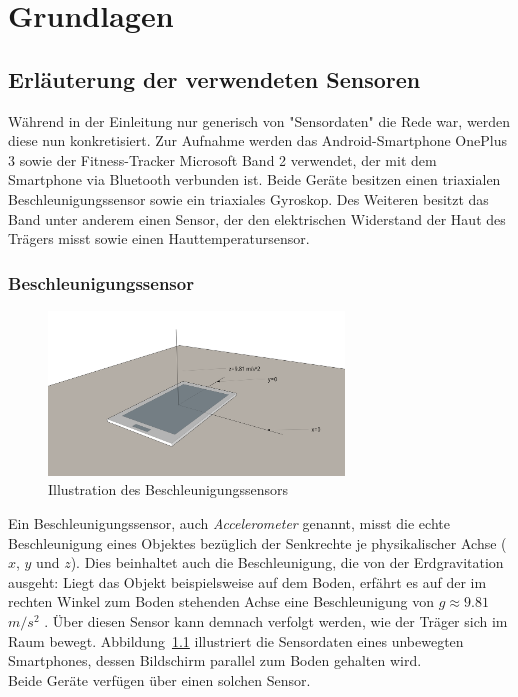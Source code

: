 \chapter{Grundlagen}
\label{chap:background}
\section{Erläuterung der verwendeten Sensoren}
\label{sec:sensors}
Während in der Einleitung nur generisch von "Sensordaten" die Rede war, werden diese nun konkretisiert. Zur Aufnahme werden das Android-Smartphone OnePlus 3 sowie der Fitness-Tracker Microsoft Band 2 verwendet, der mit dem Smartphone via Bluetooth verbunden ist. Beide Geräte besitzen einen triaxialen Beschleunigungssensor sowie ein triaxiales Gyroskop. Des Weiteren besitzt das Band unter anderem einen Sensor, der den elektrischen Widerstand der Haut des Trägers misst sowie einen Hauttemperatursensor.

\subsection{Beschleunigungssensor}
\begin{figure}
\centering
\includegraphics[clip=true,trim=0mm 100mm 100mm 30mm, width=0.7\textwidth]{img/accelerometer}
\caption{Illustration des Beschleunigungssensors}
\label{fig:accelerometer}
\end{figure}
Ein Beschleunigungssensor, auch \textit{Accelerometer} genannt, misst die echte Beschleunigung eines Objektes bezüglich der Senkrechte je physikalischer Achse ($x$, $y$ und $z$). Dies beinhaltet auch die Beschleunigung, die von der Erdgravitation ausgeht: Liegt das Objekt beispielsweise auf dem Boden, erfährt es auf der im rechten Winkel zum Boden stehenden Achse eine Beschleunigung von $g \approx 9.81$ $m/s^2$ \cite{SensorsOverview, nistsi}. Über diesen Sensor kann demnach verfolgt werden, wie der Träger sich im Raum bewegt. Abbildung~\ref{fig:accelerometer} illustriert die Sensordaten eines unbewegten Smartphones, dessen Bildschirm parallel zum Boden gehalten wird. \\
Beide Geräte verfügen über einen solchen Sensor.


